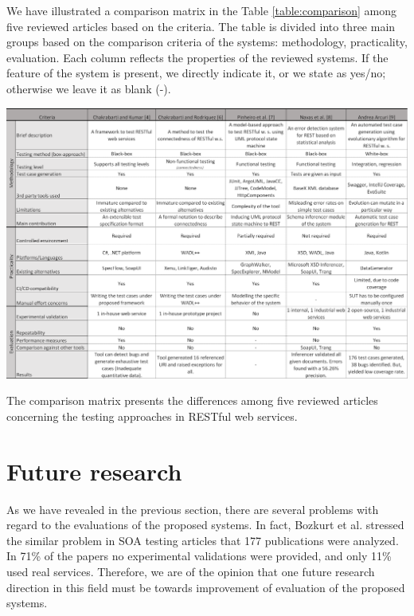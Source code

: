 \documentclass[english]{tktltiki}
\begin{document}
We have illustrated a comparison matrix in the Table \ref{table:comparison} among five reviewed articles based on the criteria. The table is divided into three main groups based on the comparison criteria of the systems: methodology, practicality, evaluation. Each column reflects the properties of the reviewed systems. If the feature of the system is present, we directly indicate it, or we state as yes/no; otherwise we leave it as blank (-).

\begin{table}[h]
	\begin{center}
		\hspace*{-1.25cm}
		\includegraphics[width=1.1\textwidth]{images/comparison.png}
		\caption{The comparison matrix presents the differences among five reviewed articles concerning the testing approaches in RESTful web services.}
		\label{table:comparison}
	\end{center}
\end{table}

\section{Future research}
As we have revealed in the previous section, there are several problems with regard to the evaluations of the proposed systems. In fact, Bozkurt et al. \cite{bozkurt2013testing} stressed the similar problem in SOA testing articles that 177 publications were analyzed. In 71\% of the papers no experimental validations were provided, and only 11\% used real services. Therefore, we are of the opinion that one future research direction in this field must be towards improvement of evaluation of the proposed systems.
\end{document}
